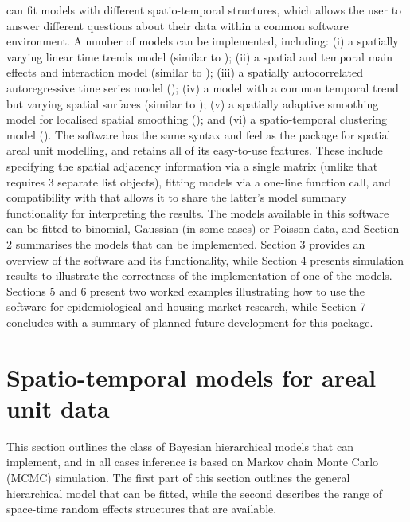 \documentclass[article, nojss]{jss}
\begin{document}
 can fit models with different spatio-temporal structures, which allows the user to answer different questions about their data within a common software environment. A number of models can be implemented, including: (i) a spatially varying linear time trends model (similar to \citealp{bernardinelli1995}); (ii) a spatial and temporal main effects and interaction model (similar to \citealp{knorrheld2000}); (iii) a spatially autocorrelated autoregressive time series model (\citealp{rushworth2014}); (iv) a model with a common temporal trend but varying spatial surfaces (similar to \citealp{napier2016}); (v) a spatially adaptive smoothing model for localised spatial smoothing (\citealp{rushworth2016}); and (vi) a spatio-temporal clustering model (\citealp{lee2016}). The software has the same syntax and feel as the  package  for spatial areal unit modelling, and retains all of its easy-to-use features. These include specifying the spatial adjacency information via a single matrix (unlike  that requires 3 separate list objects), fitting models via a one-line function call, and compatibility with  that allows it to share the latter's model summary functionality for interpreting the results. The models available in this software can be fitted to binomial, Gaussian (in some cases) or Poisson data, and Section 2 summarises the models that can be implemented. Section 3 provides an overview of the software and its functionality, while Section 4 presents simulation results to illustrate the correctness of the  implementation of one of the models. Sections 5 and 6 present two worked examples illustrating how to use the software for epidemiological and housing market research, while Section 7 concludes with a summary of planned future development  for this package.



\section{Spatio-temporal models for areal unit data}
This section outlines the class of Bayesian hierarchical models that  can implement, and in all cases inference is based on Markov chain Monte Carlo (MCMC) simulation. The first part of this section outlines the general hierarchical model that can be fitted, while the second describes the range of space-time random effects structures that are available.
\end{document}
